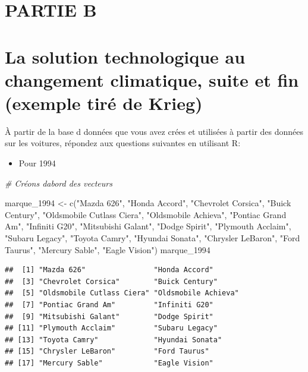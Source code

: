 \documentclass[
]{article}
\newenvironment{Shaded}{\begin{snugshade}}{\end{snugshade}}
\newcommand{\CommentTok}[1]{\textcolor[rgb]{0.56,0.35,0.01}{\textit{#1}}}
\newcommand{\FunctionTok}[1]{\textcolor[rgb]{0.00,0.00,0.00}{#1}}
\newcommand{\NormalTok}[1]{#1}
\newcommand{\OtherTok}[1]{\textcolor[rgb]{0.56,0.35,0.01}{#1}}
\newcommand{\StringTok}[1]{\textcolor[rgb]{0.31,0.60,0.02}{#1}}
\providecommand{\tightlist}{%
  \setlength{\itemsep}{0pt}\setlength{\parskip}{0pt}}
\begin{document}
\hypertarget{partie-b}{%
\section{PARTIE B}\label{partie-b}}

\hypertarget{la-solution-technologique-au-changement-climatique-suite-et-fin-exemple-tiruxe9-de-krieg}{%
\section{La solution technologique au changement climatique, suite et
fin (exemple tiré de
Krieg)}\label{la-solution-technologique-au-changement-climatique-suite-et-fin-exemple-tiruxe9-de-krieg}}

À partir de la base d données que vous avez crées et utilisées à partir
des données sur les voitures, répondez aux questions suivantes en
utilisant R:

\begin{itemize}
\tightlist
\item
  Pour 1994
\end{itemize}

\begin{Shaded}
\begin{Highlighting}[]
\CommentTok{\# Créons d\textquotesingle{}abord des vecteurs}

\NormalTok{marque\_1994 }\OtherTok{\textless{}{-}} \FunctionTok{c}\NormalTok{(}\StringTok{"Mazda 626"}\NormalTok{, }\StringTok{"Honda Accord"}\NormalTok{, }\StringTok{"Chevrolet Corsica"}\NormalTok{, }\StringTok{"Buick Century"}\NormalTok{, }\StringTok{"Oldsmobile Cutlass Ciera"}\NormalTok{, }\StringTok{"Oldsmobile Achieva"}\NormalTok{, }\StringTok{"Pontiac Grand Am"}\NormalTok{, }\StringTok{"Infiniti G20"}\NormalTok{, }\StringTok{"Mitsubishi Galant"}\NormalTok{, }\StringTok{"Dodge Spirit"}\NormalTok{, }\StringTok{"Plymouth Acclaim"}\NormalTok{, }\StringTok{"Subaru Legacy"}\NormalTok{, }\StringTok{"Toyota Camry"}\NormalTok{, }\StringTok{"Hyundai Sonata"}\NormalTok{, }\StringTok{"Chrysler LeBaron"}\NormalTok{, }\StringTok{"Ford Taurus"}\NormalTok{, }\StringTok{"Mercury Sable"}\NormalTok{, }\StringTok{"Eagle Vision"}\NormalTok{)}
\NormalTok{marque\_1994}
\end{Highlighting}
\end{Shaded}

\begin{verbatim}
##  [1] "Mazda 626"                "Honda Accord"            
##  [3] "Chevrolet Corsica"        "Buick Century"           
##  [5] "Oldsmobile Cutlass Ciera" "Oldsmobile Achieva"      
##  [7] "Pontiac Grand Am"         "Infiniti G20"            
##  [9] "Mitsubishi Galant"        "Dodge Spirit"            
## [11] "Plymouth Acclaim"         "Subaru Legacy"           
## [13] "Toyota Camry"             "Hyundai Sonata"          
## [15] "Chrysler LeBaron"         "Ford Taurus"             
## [17] "Mercury Sable"            "Eagle Vision"
\end{verbatim}
\end{document}
